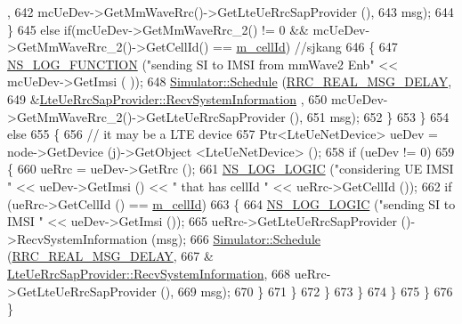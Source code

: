 \begin{DoxyCode}
      ,
642                                      mcUeDev->GetMmWaveRrc()->GetLteUeRrcSapProvider (), 
643                                      msg); 
644               \}
645               \textcolor{keywordflow}{else} \textcolor{keywordflow}{if}(mcUeDev->GetMmWaveRrc\_2() != 0 && mcUeDev->GetMmWaveRrc\_2()->GetCellId() == 
      \hyperlink{classns3_1_1MmWaveLteEnbRrcProtocolReal_af21fba3734d1818dc9166e6ab8817b66}{m\_cellId}) \textcolor{comment}{//sjkang}
646               \{
647                 \hyperlink{log-macros-disabled_8h_a90b90d5bad1f39cb1b64923ea94c0761}{NS\_LOG\_FUNCTION} (\textcolor{stringliteral}{"sending SI to IMSI from mmWave2 Enb"} << mcUeDev->GetImsi (
      ));
648                 \hyperlink{classns3_1_1Simulator_a671882c894a08af4a5e91181bf1eec13}{Simulator::Schedule} (\hyperlink{namespacens3_a8e3f859197e39602ba3ea59033f00404}{RRC\_REAL\_MSG\_DELAY},
649                                      &\hyperlink{classns3_1_1LteUeRrcSapProvider_a34d16c5adabf7ee0caf111fd2b6bfbd3}{LteUeRrcSapProvider::RecvSystemInformation}
      ,
650                                      mcUeDev->GetMmWaveRrc\_2()->GetLteUeRrcSapProvider (),
651                                      msg);
652               \}
653             \}
654             \textcolor{keywordflow}{else}
655             \{
656               \textcolor{comment}{// it may be a LTE device}
657               Ptr<LteUeNetDevice> ueDev = node->GetDevice (j)->GetObject <LteUeNetDevice> ();
658               \textcolor{keywordflow}{if} (ueDev != 0)
659               \{
660                 ueRrc = ueDev->GetRrc ();              
661                 \hyperlink{group__logging_ga88acd260151caf2db9c0fc84997f45ce}{NS\_LOG\_LOGIC} (\textcolor{stringliteral}{"considering UE IMSI "} << ueDev->GetImsi () << \textcolor{stringliteral}{" that has cellId 
      "} << ueRrc->GetCellId ());
662                 \textcolor{keywordflow}{if} (ueRrc->GetCellId () == \hyperlink{classns3_1_1MmWaveLteEnbRrcProtocolReal_af21fba3734d1818dc9166e6ab8817b66}{m\_cellId})
663                 \{       
664                   \hyperlink{group__logging_ga88acd260151caf2db9c0fc84997f45ce}{NS\_LOG\_LOGIC} (\textcolor{stringliteral}{"sending SI to IMSI "} << ueDev->GetImsi ());
665                   ueRrc->GetLteUeRrcSapProvider ()->RecvSystemInformation (msg);
666                   \hyperlink{classns3_1_1Simulator_a671882c894a08af4a5e91181bf1eec13}{Simulator::Schedule} (\hyperlink{namespacens3_a8e3f859197e39602ba3ea59033f00404}{RRC\_REAL\_MSG\_DELAY}, 
667                                        &
      \hyperlink{classns3_1_1LteUeRrcSapProvider_a34d16c5adabf7ee0caf111fd2b6bfbd3}{LteUeRrcSapProvider::RecvSystemInformation},
668                                        ueRrc->GetLteUeRrcSapProvider (), 
669                                        msg);          
670                 \}             
671               \}
672             \}
673           \}
674         \}
675     \} 
676 \}
\end{DoxyCode}


